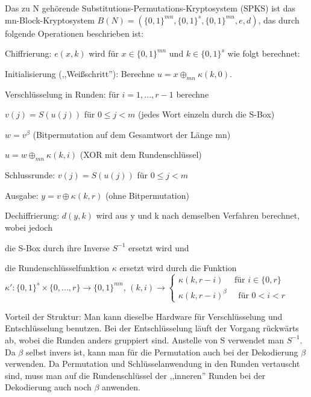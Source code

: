 \documentclass[a4paper]{article}
\begin{document}
\begin{multicols}{3}
    Das zu N gehörende Substitutions-Permutations-Kryptosystem (SPKS) ist das mn-Block-Kryptosystem $B(N)=(\{0,1\}^{mn},\{0,1\}^s,\{0,1\}^{mn},e,d)$, das durch folgende Operationen beschrieben ist:

    Chiffrierung: $e(x,k)$ wird für $x\in\{0,1\}^{mn}$ und $k\in\{0,1\}^s$ wie folgt berechnet:
    \begin{enumerate*}
        \item Initialisierung (,,Weißschritt''): Berechne $u=x\oplus_{mn} \kappa (k,0)$.
        \item Verschlüsselung in Runden: für $i=1,...,r-1$ berechne
        \begin{enumerate*}
            \item $v(j)=S(u(j))$ für $0\leq j<m$ (jedes Wort einzeln durch die S-Box)
            \item $w=v^{\beta}$ (Bitpermutation auf dem Gesamtwort der Länge mn)
            \item $u=w\oplus_{mn} \kappa (k,i)$ (XOR mit dem Rundenschlüssel)
            \item Schlussrunde: $v(j)=S(u(j))$ für $0\leq j<m$
            \item Ausgabe: $y=v\oplus \kappa (k,r)$ (ohne Bitpermutation)
        \end{enumerate*}
    \end{enumerate*}

    Dechiffrierung: $d(y,k)$ wird aus y und k nach demselben Verfahren berechnet, wobei jedoch
    \begin{enumerate*}
        \item die S-Box durch ihre Inverse $S^{-1}$ ersetzt wird und
        \item die Rundenschlüsselfunktion $\kappa$ ersetzt wird durch die Funktion $\kappa':\{0,1\}^s\times\{0,...,r\}\rightarrow\{0,1\}^{mn}$, $(k,i)\rightarrow\begin{cases} \kappa (k,r-i)\quad\text{ für } i\in\{0,r\}\\ \kappa(k,r-i)^{\beta} \quad\text{ für } 0<i<r \end{cases}$
    \end{enumerate*}

    Vorteil der Struktur: Man kann dieselbe Hardware für Verschlüsselung und Entschlüsselung benutzen. Bei der Entschlüsselung läuft der Vorgang rückwärts ab, wobei die Runden anders gruppiert sind. Anstelle von S verwendet man $S^{-1}$. Da $\beta$ selbst invers ist, kann man für die Permutation auch bei der Dekodierung $\beta$ verwenden. Da Permutation und Schlüsselanwendung in den Runden vertauscht sind, muss man auf die Rundenschlüssel der ,,inneren'' Runden bei der Dekodierung auch noch $\beta$ anwenden.


\end{multicols}
\end{document}
